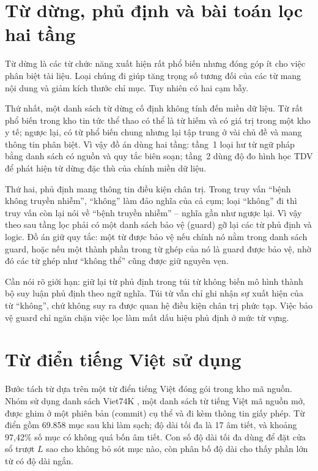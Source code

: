 \section{Từ dừng, phủ định và bài toán lọc hai tầng}

Từ dừng là các từ chức năng xuất hiện rất phổ biến nhưng đóng góp ít cho việc phân
biệt tài liệu. Loại chúng đi giúp tăng trọng số tương đối của các từ mang nội dung
và giảm kích thước chỉ mục. Tuy nhiên có hai cạm bẫy.

Thứ nhất, một danh sách từ dừng cố định không tính đến miền dữ liệu. Từ rất phổ
biến trong kho tin tức thể thao có thể là từ hiếm và có giá trị trong một kho y
tế; ngược lại, có từ phổ biến chung nhưng lại tập trung ở vài chủ đề và mang
thông tin phân biệt. Vì vậy đồ án dùng hai tầng: tầng~1 loại hư từ ngữ pháp bằng
danh sách có nguồn và quy tắc biên soạn; tầng~2 dùng độ đo hình học TDV để phát
hiện từ dừng đặc thù của chính miền dữ liệu.

Thứ hai, phủ định mang thông tin điều kiện chân trị. Trong truy vấn ``bệnh không
truyền nhiễm'', ``không'' làm đảo nghĩa của cả cụm; loại ``không'' đi thì truy vấn
còn lại nói về ``bệnh truyền nhiễm'' -- nghĩa gần như ngược lại. Vì vậy theo sau
tầng lọc phải có một danh sách bảo vệ (guard) gỡ lại các từ phủ định và logic.
Đồ án giữ quy tắc: một từ được bảo vệ nếu chính nó nằm trong danh sách guard, hoặc
nếu một thành phần trong từ ghép của nó là guard được bảo vệ, nhờ đó các từ ghép
như ``không thể'' cũng được giữ nguyên vẹn.

Cần nói rõ giới hạn: giữ lại từ phủ định trong túi từ không biến mô hình thành bộ
suy luận phủ định theo ngữ nghĩa. Túi từ vẫn chỉ ghi nhận sự xuất hiện của từ
``không'', chứ không suy ra được quan hệ điều kiện chân trị phức tạp. Việc bảo vệ
guard chỉ ngăn chặn việc lọc làm mất dấu hiệu phủ định ở mức từ vựng.

\section{Từ điển tiếng Việt sử dụng}

Bước tách từ dựa trên một từ điển tiếng Việt đóng gói trong kho mã nguồn. Nhóm sử
dụng danh sách Viet74K \cite{viet74k}, một danh sách từ tiếng Việt mã nguồn mở,
được ghim ở một phiên bản (commit) cụ thể và đi kèm thông tin giấy phép. Từ điển
gồm 69.858 mục sau khi làm sạch; độ dài tối đa là 17 âm tiết, và khoảng 97,42\%
số mục có không quá bốn âm tiết. Con số độ dài tối đa dùng để đặt cửa sổ trượt
$L$ sao cho không bỏ sót mục nào, còn phân bố độ dài cho thấy phần lớn từ có độ
dài ngắn.

